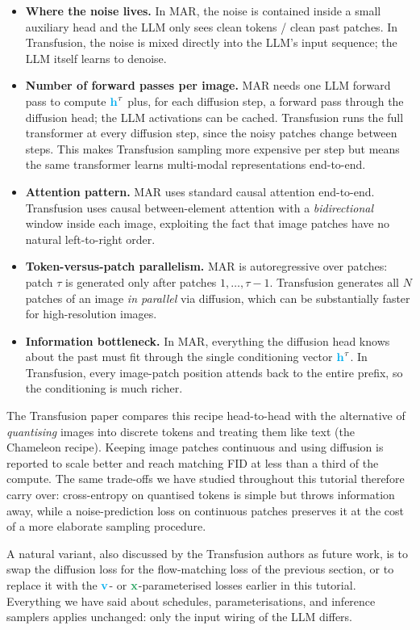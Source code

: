 \documentclass[usenames,dvipsnames]{article}
\newcommand{\myvec}[1]{\mathbf{#1}}
\newcommand{\vx}{\myvec{\textcolor{ForestGreen}{x}}}
\newcommand{\vh}{\myvec{\textcolor{Cyan}{h}}}
\newcommand{\vv}{\myvec{\textcolor{Cyan}{v}}}
\begin{document}
\begin{itemize}
    \item \textbf{Where the noise lives.} In MAR, the noise is contained inside a small auxiliary head and the LLM only sees clean tokens / clean past patches. In Transfusion, the noise is mixed directly into the LLM's input sequence; the LLM itself learns to denoise.
    \item \textbf{Number of forward passes per image.} MAR needs one LLM forward pass to compute $\vh^\tau$ plus, for each diffusion step, a forward pass through the diffusion head; the LLM activations can be cached. Transfusion runs the full transformer at every diffusion step, since the noisy patches change between steps. This makes Transfusion sampling more expensive per step but means the same transformer learns multi-modal representations end-to-end.
    \item \textbf{Attention pattern.} MAR uses standard causal attention end-to-end. Transfusion uses causal between-element attention with a \emph{bidirectional} window inside each image, exploiting the fact that image patches have no natural left-to-right order.
    \item \textbf{Token-versus-patch parallelism.} MAR is autoregressive over patches: patch $\tau$ is generated only after patches $1, \dots, \tau-1$. Transfusion generates all $N$ patches of an image \emph{in parallel} via diffusion, which can be substantially faster for high-resolution images.
    \item \textbf{Information bottleneck.} In MAR, everything the diffusion head knows about the past must fit through the single conditioning vector $\vh^\tau$. In Transfusion, every image-patch position attends back to the entire prefix, so the conditioning is much richer.
\end{itemize}

The Transfusion paper compares this recipe head-to-head with the alternative of \emph{quantising} images into discrete tokens and treating them like text (the Chameleon recipe). Keeping image patches continuous and using diffusion is reported to scale better and reach matching FID at less than a third of the compute. The same trade-offs we have studied throughout this tutorial therefore carry over: cross-entropy on quantised tokens is simple but throws information away, while a noise-prediction loss on continuous patches preserves it at the cost of a more elaborate sampling procedure.

A natural variant, also discussed by the Transfusion authors as future work, is to swap the diffusion loss for the flow-matching loss of the previous section, or to replace it with the $\vv$- or $\vx$-parameterised losses earlier in this tutorial. Everything we have said about schedules, parameterisations, and inference samplers applies unchanged: only the input wiring of the LLM differs.
\end{document}
